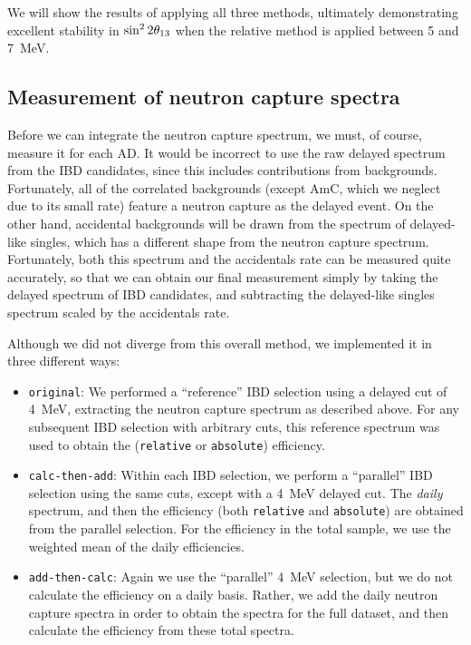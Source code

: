\documentclass[../thesis.tex]{subfiles}
\begin{document}
We will show the results of applying all three methods, ultimately demonstrating excellent stability in $\sin^2 2\theta_{13}$ when the relative method is applied between 5 and 7~MeV.

\subsection{Measurement of neutron capture spectra}
\label{sec:cutVaryDelCutSpecMeas}

Before we can integrate the neutron capture spectrum, we must, of course, measure it for each AD. It would be incorrect to use the raw delayed spectrum from the IBD candidates, since this includes contributions from backgrounds. Fortunately, all of the correlated backgrounds (except AmC, which we neglect due to its small rate) feature a neutron capture as the delayed event. On the other hand, accidental backgrounds will be drawn from the spectrum of delayed-like singles, which has a different shape from the neutron capture spectrum. Fortunately, both this spectrum and the accidentals rate can be measured quite accurately, so that we can obtain our final measurement simply by taking the delayed spectrum of IBD candidates, and subtracting the delayed-like singles spectrum scaled by the accidentals rate.

Although we did not diverge from this overall method, we implemented it in three different ways:

\begin{itemize}
\item \texttt{original}: We performed a ``reference'' IBD selection using a delayed cut of 4~MeV, extracting the neutron capture spectrum as described above. For any subsequent IBD selection with arbitrary cuts, this reference spectrum was used to obtain the (\texttt{relative} or \texttt{absolute}) efficiency.
\item \texttt{calc-then-add}: Within each IBD selection, we perform a ``parallel'' IBD selection using the same cuts, except with a 4~MeV delayed cut. The \emph{daily} spectrum, and then the efficiency (both \texttt{relative} and \texttt{absolute}) are obtained from the parallel selection. For the efficiency in the total sample, we use the weighted mean of the daily efficiencies.
\item \texttt{add-then-calc}: Again we use the ``parallel'' 4~MeV selection, but we do not calculate the efficiency on a daily basis. Rather, we add the daily neutron capture spectra in order to obtain the spectra for the full dataset, and then calculate the efficiency from these total spectra.
\end{itemize}
\end{document}
